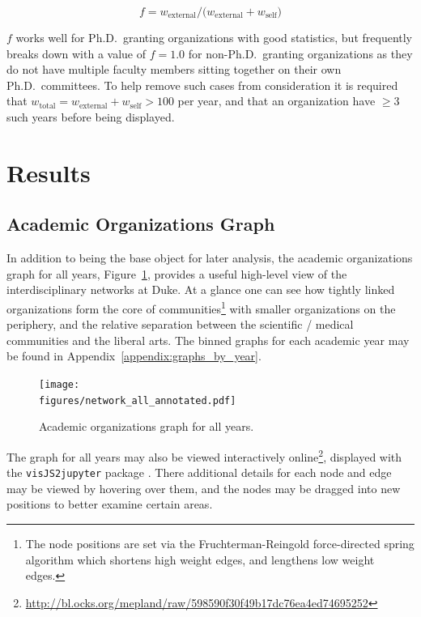 \documentclass[notitlepage,aps,prd,nofootinbib]{revtex4-1}
\newcommand{\figures}{../outputs/plots}
\begin{document}
\begin{equation} \label{eq:intdisfrac}
f = w_{\text{external}} / \big(w_{\text{external}} + w_{\text{self}}\big)
\end{equation}

$f$ works well for Ph.D.\ granting organizations with good statistics, but frequently breaks down with a value of $f=1.0$ for non-Ph.D.\ granting organizations as they do not have multiple faculty members sitting together on their own Ph.D.\ committees. To help remove such cases from consideration it is required that $w_{\text{total}} = w_{\text{external}} + w_{\text{self}} > 100$ per year, and that an organization have $\geq 3$ such years before being displayed.


\section{Results}
\subsection{Academic Organizations Graph}

In addition to being the base object for later analysis, the academic organizations graph for all years, Figure~\ref{fig:graph_all_years}, provides a useful high-level view of the interdisciplinary networks at Duke. At a glance one can see how tightly linked organizations form the core of communities\footnote{The node positions are set via the Fruchterman-Reingold force-directed spring algorithm which shortens high weight edges, and lengthens low weight edges.} with smaller organizations on the periphery, and the relative separation between the scientific / medical communities and the liberal arts. The binned graphs for each academic year may be found in Appendix~\ref{appendix:graphs_by_year}.

\begin{figure}[!htb]\centering
  \texttt{[image: \\figures/network\_all\_annotated.pdf]}
  \caption{Academic organizations graph for all years.}
  \label{fig:graph_all_years}
\end{figure}

The graph for all years may also be viewed interactively online\footnote{\url{http://bl.ocks.org/mepland/raw/598590f30f49b17dc76ea4ed74695252}}, displayed with the \texttt{visJS2jupyter} package \cite{visJS2jupyter}. There additional details for each node and edge may be viewed by hovering over them, and the nodes may be dragged into new positions to better examine certain areas.
\end{document}
